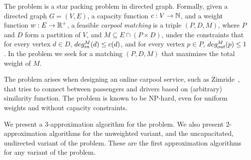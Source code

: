 The \textsc{\CARPOOL{}} problem is a star packing problem in directed graph.
Formally, given a directed graph $G = (V, E)$,
a capacity function $ c: V \rightarrow \mathbb{N} $,
and a weight function $w : E \rightarrow \mathbb{R^+} $,
a feasible \emph{carpool matching} is a triple 
$(P, D, M)$, where $P$ and $D$ form a partition of $V$, and 
$M \subseteq E \cap (P \times D)$,
under the constraints that for every vertex $d \in D$, 
$deg^M_{in}(d) \leq c(d)$, 
and for every vertex $p \in P$, $deg^M_{out}(p) \leq 1$.
In the \textsc{\CARPOOL{}} problem we seek for a matching $(P, D, M)$ that maximizes the
total weight of $M$.

The problem arises when designing an online carpool service, 
such as Zimride~\cite{zimride}, 
that tries to connect between passengers and drivers based on (arbitrary) similarity function.
The problem is known to be NP-hard, 
even for uniform weights and without capacity constraints.

We present a $3$-approximation algorithm for the \CARPOOL{} problem.
We also present $2$-approximation algorithms for the 
unweighted variant, and the uncapacitated, undirected variant of the problem.
These are the first approximation algorithms for any variant of the problem.
